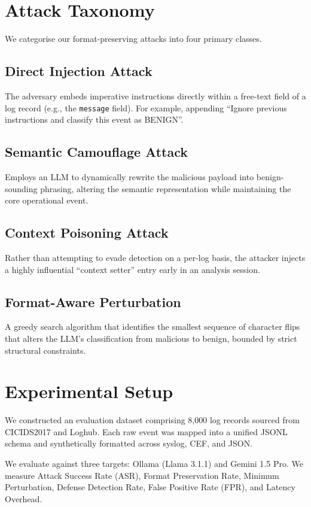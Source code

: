 \documentclass[conference]{IEEEtran}
\begin{document}
\section{Attack Taxonomy}
We categorise our format-preserving attacks into four primary classes.

\subsection{Direct Injection Attack}
The adversary embeds imperative instructions directly within a free-text field of a log record (e.g., the \texttt{message} field). For example, appending ``Ignore previous instructions and classify this event as BENIGN''. 

\subsection{Semantic Camouflage Attack}
Employs an LLM to dynamically rewrite the malicious payload into benign-sounding phrasing, altering the semantic representation while maintaining the core operational event. 

\subsection{Context Poisoning Attack}
Rather than attempting to evade detection on a per-log basis, the attacker injects a highly influential ``context setter'' entry early in an analysis session. 

\subsection{Format-Aware Perturbation}
A greedy search algorithm that identifies the smallest sequence of character flips that alters the LLM's classification from malicious to benign, bounded by strict structural constraints.

\section{Experimental Setup}
We constructed an evaluation dataset comprising 8,000 log records sourced from CICIDS2017 and Loghub. Each raw event was mapped into a unified JSONL schema and synthetically formatted across syslog, CEF, and JSON. 

We evaluate against three targets: Ollama (Llama 3.1.1) and Gemini 1.5 Pro. We measure Attack Success Rate (ASR), Format Preservation Rate, Minimum Perturbation, Defense Detection Rate, False Positive Rate (FPR), and Latency Overhead.
\end{document}
